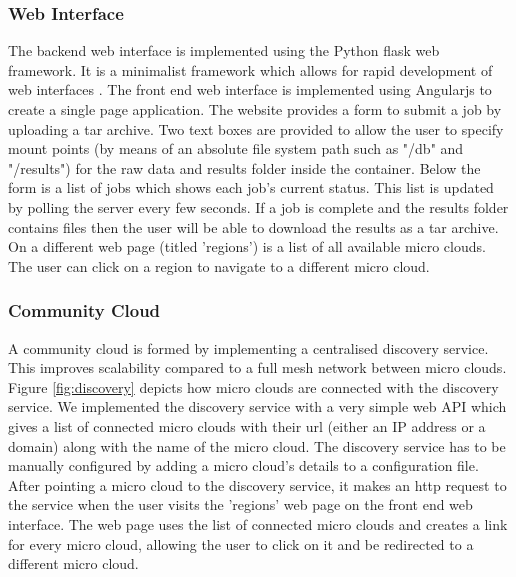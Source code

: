 \documentclass{sig-alternate-05-2015}
\begin{document}
\subsubsection{Web Interface}
The backend web interface is implemented using the Python flask web framework. It is a minimalist framework which allows for rapid development of web interfaces \cite{pythonflask}. 
The front end web interface is implemented using Angularjs to create a single page application. The website provides a form to submit a job by uploading a tar archive. Two text boxes are provided to allow the user to specify mount points (by means of an absolute file system path such as "/db" and "/results") for the raw data and results folder inside the container. Below the form is a list of jobs which shows each job's current status. This list is updated by polling the server every few seconds. If a job is complete and the results folder contains files then the user will be able to download the results as a tar archive. On a different web page (titled 'regions') is a list of all available micro clouds. The user can click on a region to navigate to a different micro cloud.

\subsubsection{Community Cloud}
A community cloud is formed by implementing a centralised discovery service. This improves scalability compared to a full mesh network between micro clouds. Figure \ref{fig:discovery} depicts how micro clouds are connected with the discovery service. We implemented the discovery service with a very simple web API which gives a list of connected micro clouds with their url (either an IP address or a domain) along with the name of the micro cloud. The discovery service has to be manually configured by adding a micro cloud's details to a configuration file. After pointing a micro cloud to the discovery service, it makes an http request to the service when the user visits the 'regions' web page on the front end web interface. The web page uses the list of connected micro clouds and creates a link for every micro cloud, allowing the user to click on it and be redirected to a different micro cloud. 
\end{document}
